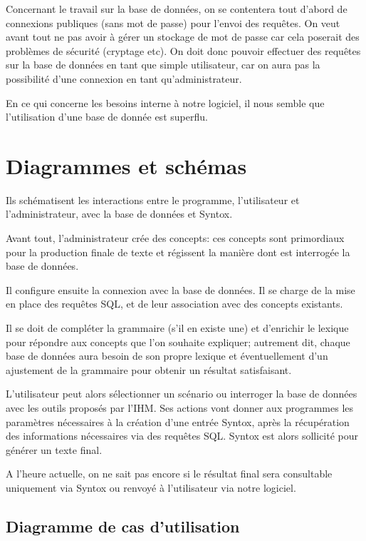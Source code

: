 \documentclass[12pt]{report}
\begin{document}
Concernant le travail sur la base de données, on se contentera tout
d'abord de connexions publiques (sans mot de passe) pour l'envoi des
requêtes. On veut avant tout ne pas avoir à gérer un stockage de mot de
passe car cela poserait des problèmes de sécurité (cryptage etc).
On doit donc pouvoir effectuer des requêtes sur la base de données en
tant que simple utilisateur, car on aura pas la possibilité d'une
connexion en tant qu'administrateur.

En ce qui concerne les besoins interne à notre logiciel, il nous semble
que l'utilisation d'une base de donnée est superflu.  

\section{Diagrammes et schémas}

Ils schématisent les interactions entre le programme, l'utilisateur et l'administrateur, avec la base de données et Syntox.

Avant tout, l'administrateur crée des concepts: ces concepts sont primordiaux pour la production finale de texte et régissent la manière dont est interrogée la base de données.

Il configure ensuite la connexion avec la base de données. Il se charge de la mise en place des requêtes SQL, et de leur association avec des concepts existants.

Il se doit de compléter la grammaire (s'il en existe une) et d'enrichir le lexique pour répondre aux concepts que l'on souhaite expliquer; autrement dit, chaque base de données aura besoin de son propre lexique et éventuellement d'un ajustement de la grammaire pour obtenir un résultat satisfaisant.

L'utilisateur peut alors sélectionner un scénario ou interroger la base de données avec les outils proposés par l'IHM. Ses actions vont donner aux programmes les paramètres nécessaires à la création d'une entrée Syntox, après la récupération des informations nécessaires via des requêtes SQL. Syntox est alors sollicité pour générer un texte final.

A l'heure actuelle, on ne sait pas encore si le résultat final sera consultable uniquement via Syntox ou renvoyé à l'utilisateur via notre logiciel.

\subsection{Diagramme de cas d'utilisation}
\end{document}
